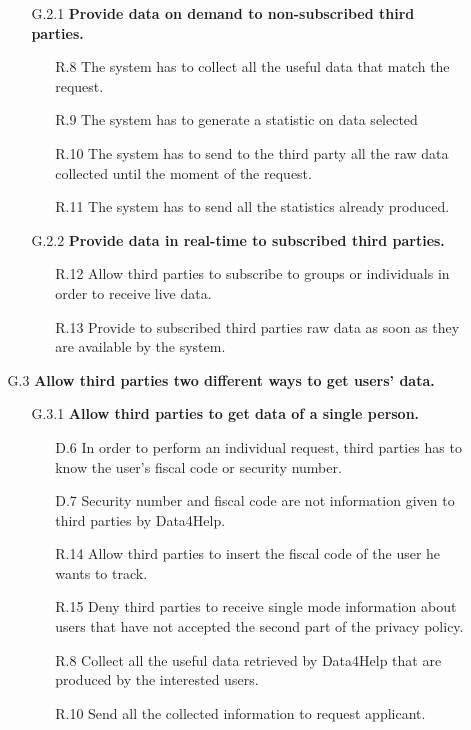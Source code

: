 \begin{enumerate}
\begin{enumerate}
		\begin{enumerate} 
		\item [G.2.1] \textbf{Provide data on demand to non-subscribed third parties.}
		\begin{enumerate} 

		\item [R.8] The system has to collect all the useful data that match the request.
		\item [R.9] The system has to generate a statistic on data selected 
		\item [R.10] The system has to send to the third party all the raw data collected until the moment of the request.
		\item [R.11] The system has to send all the statistics already produced.
    	\end{enumerate}	
    	
    	\item [G.2.2] \textbf{Provide data in real-time to subscribed third parties.}
		\begin{enumerate}
    	\item [R.12] Allow third parties to subscribe to groups or individuals in order to receive live data.
    	\item [R.13] Provide to subscribed third parties raw data as soon as they are available by the system.
    	\end{enumerate}
    	\end{enumerate}
    
	\item [G.3] \textbf{Allow third parties two different ways to get users' data.}
		\begin{enumerate}     
    	\item [G.3.1] \textbf{Allow third parties to get data of a single person.}
		\begin{enumerate}
		\item [D.6] In order to perform an individual request, third parties has to know the user's fiscal code or security number.
		\item [D.7] Security number and fiscal code are not information given to third parties by Data4Help.
    	\item [R.14] Allow third parties to insert the fiscal code of the user he wants to track.
    	\item [R.15] Deny third parties to receive single mode information about users that have not accepted the second part of the privacy policy.
    	\item [R.8] Collect all the useful data retrieved by Data4Help that are produced by the interested users. 
    	\item [R.10] Send all the collected information to request applicant.
    	\end{enumerate}
    

\end{enumerate}
\end{enumerate}
\end{enumerate}
